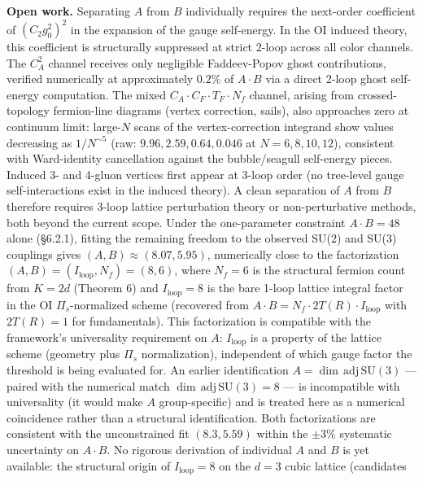 \documentclass[
]{article}
\begin{document}
\textbf{Open work.} Separating \(A\) from \(B\) individually requires
the next-order coefficient of \((C_2 g_0^2)^2\) in the expansion of the
gauge self-energy. In the OI induced theory, this coefficient is
structurally suppressed at strict 2-loop across all color channels. The
\(C_A^2\) channel receives only negligible Faddeev-Popov ghost
contributions, verified numerically at approximately \(0.2\%\) of
\(A \cdot B\) via a direct 2-loop ghost self-energy computation. The
mixed \(C_A \cdot C_F \cdot T_F \cdot N_f\) channel, arising from
crossed-topology fermion-line diagrams (vertex correction, sails), also
approaches zero at continuum limit: large-\(N\) scans of the
vertex-correction integrand show values decreasing as \(1/N^{\sim 5}\)
(raw: \(9.96, 2.59, 0.64, 0.046\) at \(N = 6, 8, 10, 12\)), consistent
with Ward-identity cancellation against the bubble/seagull self-energy
pieces. Induced 3- and 4-gluon vertices first appear at 3-loop order (no
tree-level gauge self-interactions exist in the induced theory). A clean
separation of \(A\) from \(B\) therefore requires 3-loop lattice
perturbation theory or non-perturbative methods, both beyond the current
scope. Under the one-parameter constraint \(A \cdot B = 48\) alone
(§6.2.1), fitting the remaining freedom to the observed SU(2) and SU(3)
couplings gives \((A, B) \approx (8.07, 5.95)\), numerically close to
the factorization \((A, B) = (I_{\text{loop}}, N_f) = (8, 6)\), where
\(N_f = 6\) is the structural fermion count from \(K = 2d\) (Theorem 6)
and \(I_{\text{loop}} = 8\) is the bare 1-loop lattice integral factor
in the OI \(\Pi_s\)-normalized scheme (recovered from
\(A \cdot B = N_f \cdot 2T(R) \cdot I_{\text{loop}}\) with \(2T(R) = 1\)
for fundamentals). This factorization is compatible with the framework's
universality requirement on \(A\): \(I_{\text{loop}}\) is a property of
the lattice scheme (geometry plus \(\Pi_s\) normalization), independent
of which gauge factor the threshold is being evaluated for. An earlier
identification \(A = \dim\,\mathrm{adj}\,\mathrm{SU}(3)\) --- paired
with the numerical match \(\dim\,\mathrm{adj}\,\mathrm{SU}(3) = 8\) ---
is incompatible with universality (it would make \(A\) group-specific)
and is treated here as a numerical coincidence rather than a structural
identification. Both factorizations are consistent with the
unconstrained fit \((8.3, 5.59)\) within the \(\pm 3\%\) systematic
uncertainty on \(A \cdot B\). No rigorous derivation of individual \(A\)
and \(B\) is yet available: the structural origin of
\(I_{\text{loop}} = 8\) on the \(d = 3\) cubic lattice (candidates
\end{document}
